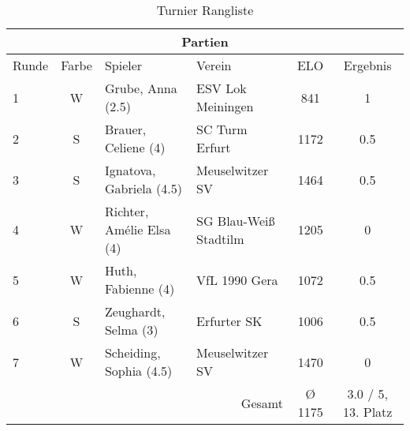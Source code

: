 \begin{table}[H]
\centering
\caption{Turnier Rangliste}
\begin{tabular}{|l|c|l|l|c|c|}
\hline
\multicolumn{6}{|c|}{Partien} \\
\hline
Runde & Farbe & Spieler & Verein & ELO & Ergebnis \\
\hline
1 & W & Grube, Anna (2.5) & ESV Lok Meiningen & 841 & 1 \\
2 & S & Brauer, Celiene (4) & SC Turm Erfurt & 1172 & 0.5 \\
3 & S & Ignatova, Gabriela (4.5) & Meuselwitzer SV & 1464 & 0.5 \\
4 & W & Richter, Amélie Elsa (4) & SG Blau-Weiß Stadtilm & 1205 & 0 \\
5 & W & Huth, Fabienne (4) & VfL 1990 Gera & 1072 & 0.5 \\
6 & S & Zeughardt, Selma (3) & Erfurter SK & 1006 & 0.5 \\
7 & W & Scheiding, Sophia (4.5) & Meuselwitzer SV & 1470 & 0 \\
\hline
\multicolumn{4}{|r|}{Gesamt} & Ø 1175 & 3.0 / 5, 13. Platz \\
\hline
\end{tabular}
\end{table}
